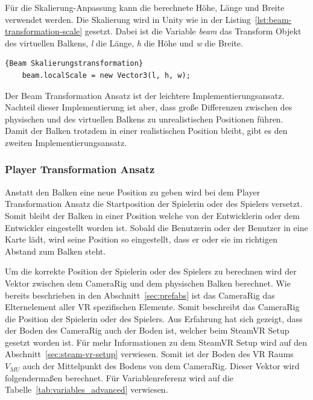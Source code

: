 Für die Skalierung-Anpassung kann die berechnete Höhe, Länge und Breite verwendet werden.
Die Skalierung wird in Unity wie in der Listing~\ref{lst:beam-transformation-scale} gesetzt.
Dabei ist die Variable \emph{beam} das Transform Objekt des virtuellen Balkens, \emph{l}  die Länge, \emph{h} die Höhe und \emph{w} die Breite.

\begin{lstlisting}[language={[Sharp]C},label={lst:beam-transformation-scale}, caption={Beam Skalierungstransformation}]{Beam Skalierungstransformation}
    beam.localScale = new Vector3(l, h, w);
\end{lstlisting}

Der Beam Transformation Ansatz ist der leichtere Implementierungsansatz.
Nachteil dieser Implementierung ist aber, dass große Differenzen zwischen des physischen und des virtuellen Balkens zu unrealistischen Positionen führen.
Damit der Balken trotzdem in einer realistischen Position bleibt, gibt es den zweiten Implementierungsansatz.

\subsubsection{Player Transformation Ansatz}

Anstatt den Balken eine neue Position zu geben wird bei dem Player Transformation Ansatz die Startposition der Spielerin oder des Spielers versetzt.
Somit bleibt der Balken in einer Position welche von der Entwicklerin oder dem Entwickler eingestellt worden ist.
Sobald die Benutzerin oder der Benutzer in eine Karte lädt, wird seine Position so eingestellt, dass er oder sie im richtigen Abstand zum Balken steht.

Um die korrekte Position der Spielerin oder des Spielers zu berechnen wird der Vektor zwischen dem CameraRig und dem physischen Balken berechnet.
Wie bereits beschrieben in den Abschnitt~\ref{sec:prefabs} ist das CameraRig das Elternelement aller VR spezifischen Elemente.
Somit beschreibt das CameraRig die Position der Spielerin oder des Spielers.
Aus Erfahrung hat sich gezeigt, dass der Boden des CameraRig auch der Boden ist, welcher beim SteamVR Setup gesetzt worden ist.
Für mehr Informationen zu dem SteamVR Setup wird auf den Abschnitt~\ref{sec:steam-vr-setup} verwiesen.
Somit ist der Boden des VR Raums $V_{MU}$ auch der Mittelpunkt des Bodens von dem CameraRig.
Dieser Vektor wird folgendermaßen berechnet.
Für Variablenreferenz wird auf die Tabelle~\ref{tab:variables_advanced} verwiesen.

